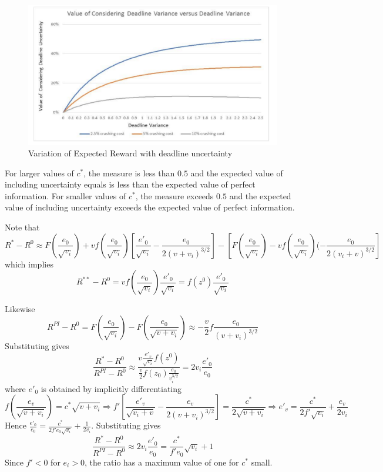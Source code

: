 \documentclass[11pt]{article}
\begin{document}
\begin{figure}[ht]
\begin{center}
\includegraphics[scale=0.30]{ProjectMgtNewsvendor.pdf}
\caption{Variation of Expected Reward with deadline uncertainty}
\label{fig:expect_reward}
\end{center}
\end{figure}
For larger values of $c^*$, the measure is less than $0.5$ and the expected value of including uncertainty equals is less than the expected value of perfect information.   For smaller values of $c^*$, the measure exceeds $0.5$ and the expected value of including uncertainty exceeds the expected value of perfect information. \par
Note that 
$$
R^*-R^0 \approx F(\frac{e_0}{\sqrt{v_i}})
+ v f(\frac{e_0}{\sqrt{v_i}}) [\frac{e'_0}{\sqrt{v_i}} - \frac{e_0}{2 (v+v_i)^{3/2}}] - [F(\frac{e_0}{\sqrt{v_i}}) - v f( \frac{e_0}{\sqrt{v_i}})   (-\frac{e_0}{2 (v_i+v)^{3/2}}]  $$
which implies
$$
R^{**}-R^0= v f(\frac{e_0}{\sqrt{v_i}} )\frac{e'_0}
{\sqrt{v_i}} =
f(z^0)\frac{e'_0}
{\sqrt{v_i}}
$$

Likewise
$$R^{PI}-R^0=F(\frac{e_0}{\sqrt{v_i}}) -
F(\frac{e_0}{\sqrt{v+v_i}}) 
\approx - \frac{v}{2} f \frac{e_0}{(v+v_i)^{3/2}} 
$$
Substituting gives
$$\frac{R^*-R^0}{R^{PI}-R^0}
 \approx \frac{v \frac{e'_v}{\sqrt{v_i}} 
 f(z^0)}{\frac{v}{2} f(z_0) \frac{e_0}{v^{3/2}_i }  }
 =2 v_i \frac{e'_0}{e_0}
  $$
where $e'_0$ is obtained by implicitly differentiating 
$$f(\frac{e_v}{\sqrt{v+v_i}})=c^* \sqrt{v+v_i} \Longrightarrow f' [\frac{e'_v}{\sqrt{v_i+v}} - \frac{e_v}{2 (v+v_i)^{3/2}}] = \frac{c^*}{2 \sqrt{v+v_i}}  \Longrightarrow
e'_v = \frac{c^*}{2 f' \sqrt{v_i}} + \frac{e_v}{2 v_i} 
$$
Hence $\frac{e'_0}{e_0} = \frac{c^*}{2 f' e_0 \sqrt{v_i}} + \frac{1}{2 v_i}  $. 
Substituting gives
$$ \frac{R^*-R^0}{R^{PI}-R^0} \approx 
2 v_i  \frac{e'_0}{e_0} = \frac{c^*}{f' e_0} \sqrt{v_i} 
+1  $$ 
Since $f'<0$ for $e_i>0$, the ratio has a maximum value of one for $c^*$ small.
\end{document}
